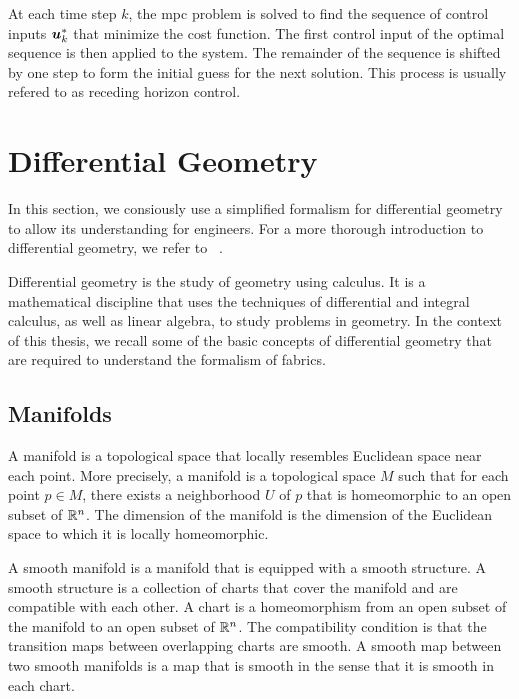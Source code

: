 At each time step $k$, the \ac{mpc} problem is solved to
find the sequence of control inputs $\bm{u}_k^*$ that minimize
the cost function. The first control input of the optimal
sequence is then applied to the system. The remainder of the
sequence is shifted by one step to form the initial guess
for the next solution. This process is usually refered to as
receding horizon control.

\section{Differential Geometry} %
\label{sec:differential_geometry}

In this section, we consiously use a simplified formalism
for differential geometry to allow its understanding for
engineers. For a more thorough introduction to differential
geometry, we refer to ~\cite{bullo2019geometric}.

Differential geometry is the study of geometry using calculus.
It is a mathematical discipline that uses the techniques of
differential and integral calculus, as well as linear
algebra, to study problems in geometry. In the context of
this thesis, we recall some of the basic concepts of
differential geometry that are required to understand the
formalism of \ac{fabrics}.

\subsection{Manifolds} %
\label{sub:manifolds}

A manifold is a topological space that locally resembles
Euclidean space near each point. More precisely, a manifold
is a topological space $M$ such that for each point $p\in
M$, there exists a neighborhood $U$ of $p$ that is
homeomorphic to an open subset of $\mathbb{R}^n$. The dimension of
the manifold is the dimension of the Euclidean space to
which it is locally homeomorphic.

A smooth manifold is a manifold that is equipped with a
smooth structure. A smooth structure is a collection of
charts that cover the manifold and are compatible with each
other. A chart is a homeomorphism from an open subset of the
manifold to an open subset of $\mathbb{R}^n$. The compatibility
condition is that the transition maps between overlapping
charts are smooth. A smooth map between two smooth manifolds
is a map that is smooth in the sense that it is smooth in
each chart.



